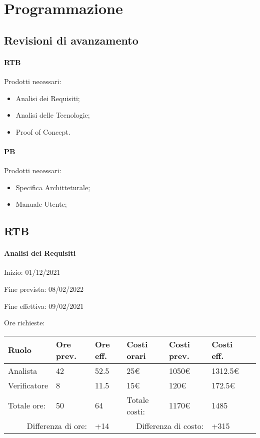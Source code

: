 \documentclass[a4paper, 12pt]{article}
\begin{document}
\makefrontpage

\makeversioni

\section{Programmazione}
\subsection{Revisioni di avanzamento}
\paragraph{RTB}
Prodotti necessari:
\begin{itemize}
\item Analisi dei Requisiti;
\item Analisi delle Tecnologie;
\item Proof of Concept.
\end{itemize}

\paragraph{PB}
Prodotti necessari:
\begin{itemize}
\item Specifica Architteturale;
\item Manuale Utente;
\end{itemize}


\subsection{RTB}
\paragraph{Analisi dei Requisiti}
Inizio: 01/12/2021\par
Fine prevista: 08/02/2022\par
Fine effettiva: 09/02/2021

Ore richieste:\\[0.5em]
\begin{tabular}{|l|l|l||l|l|l|l|}\hline
Ruolo & Ore prev. & Ore eff. & Costi orari & Costi prev. & Costi eff.\\\hline
Analista & 42 & 52.5 & 25\euro & 1050\euro & 1312.5\euro \\\hline
Verificatore & 8 & 11.5 & 15\euro & 120\euro & 172.5\euro \\\hline
Totale ore: & 50 & 64 & Totale costi: & 1170\euro & 1485 \\\hline
\multicolumn{2}{|r|}{Differenza di ore:} & +14 & \multicolumn{2}{r|}{Differenza di costo:} & +315 \\\hline
\end{tabular}
\end{document}
